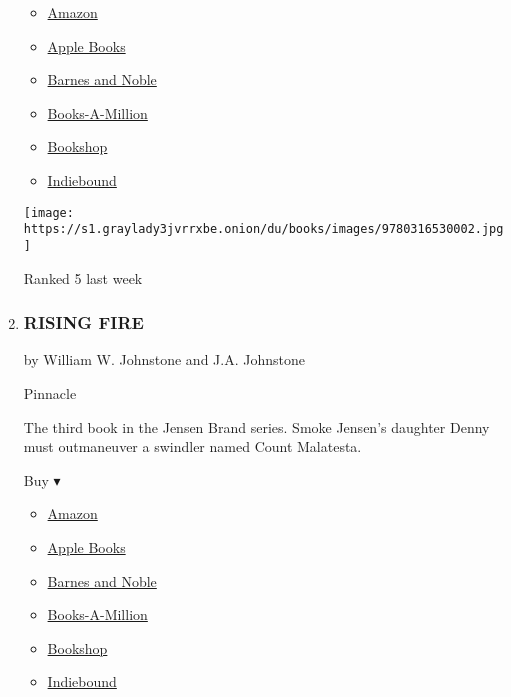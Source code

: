 \begin{enumerate}
  \begin{itemize}
  \tightlist
  \item
    \href{https://www.amazon.com/Chef-James-Patterson-ebook/dp/B07HWPRDHM?tag=NYTBS-20}{Amazon}
  \item
    \href{https://du-gae-books-dot-nyt-du-prd.appspot.com/buy?title=THE+CHEF\&author=James+Patterson+and+Max+DiLallo}{Apple
    Books}
  \item
    \href{https://www.anrdoezrs.net/click-7990613-11819508?url=https\%3A\%2F\%2Fwww.barnesandnoble.com\%2Fw\%2F\%3Fean\%3D9781538714904}{Barnes
    and Noble}
  \item
    \href{https://www.anrdoezrs.net/click-7990613-35140?url=https\%3A\%2F\%2Fwww.booksamillion.com\%2Fp\%2FTHE\%2BCHEF\%2FJames\%2BPatterson\%2Band\%2BMax\%2BDiLallo\%2F9781538714904}{Books-A-Million}
  \item
    \href{https://bookshop.org/a/3546/9781538714904}{Bookshop}
  \item
    \href{https://www.indiebound.org/book/9781538714904?aff=NYT}{Indiebound}
  \end{itemize}

  \texttt{[image: https://s1.graylady3jvrrxbe.onion/du/books/images/9780316530002.jpg]}

  Ranked 5 last week
\item
  \hypertarget{rising-fire}{%
  \subsubsection{RISING FIRE}\label{rising-fire}}

  by William W. Johnstone and J.A. Johnstone

  Pinnacle

  The third book in the Jensen Brand series. Smoke Jensen's daughter
  Denny must outmaneuver a swindler named Count Malatesta.

  Buy ▾

  \begin{itemize}
  \tightlist
  \item
    \href{https://www.amazon.com/dp/0786044209?tag=NYTBSREV-20\&tag=NYTBS-20}{Amazon}
  \item
    \href{https://du-gae-books-dot-nyt-du-prd.appspot.com/buy?title=RISING+FIRE\&author=William+W+Johnstone+and+JA+Johnstone}{Apple
    Books}
  \item
    \href{https://www.anrdoezrs.net/click-7990613-11819508?url=https\%3A\%2F\%2Fwww.barnesandnoble.com\%2Fw\%2F\%3Fean\%3D9780786044207}{Barnes
    and Noble}
  \item
    \href{https://www.anrdoezrs.net/click-7990613-35140?url=https\%3A\%2F\%2Fwww.booksamillion.com\%2Fp\%2FRISING\%2BFIRE\%2FWilliam\%2BW\%2BJohnstone\%2Band\%2BJA\%2BJohnstone\%2F9780786044207}{Books-A-Million}
  \item
    \href{https://bookshop.org/a/3546/9780786044207}{Bookshop}
  \item
    \href{https://www.indiebound.org/book/9780786044207?aff=NYT}{Indiebound}
  \end{itemize}


\end{enumerate}
